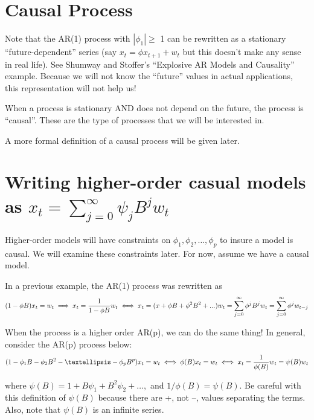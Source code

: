 \documentclass[
]{book}
\theoremstyle{definition}
\theoremstyle{definition}
\theoremstyle{definition}
\theoremstyle{definition}
\theoremstyle{remark}
\begin{document}
\hypertarget{causal-process}{%
\section{Causal Process}\label{causal-process}}

Note that the AR(1) process with \(|\phi_1|\ge\) 1 can be rewritten as a stationary ``future-dependent'' series (say \(x_t=\phi x_{t+1}+w_t\) but this doesn't make any sense in real life). See Shumway and Stoffer's ``Explosive AR Models and Causality'' example. Because we will not know the ``future'' values in actual applications, this representation will not help us!

When a process is stationary AND does not depend on the future, the process is ``causal''. These are the type of processes that we will be interested in.

A more formal definition of a causal process will be given later.

\hypertarget{writing-higher-order-casual-models-as-x_tsum_j0inftypsi_jbjw_t}{%
\section{\texorpdfstring{Writing higher-order casual models as \(x_t=\sum_{j=0}^{\infty}\psi_jB^jw_t\)}{Writing higher-order casual models as x\_t=\textbackslash sum\_\{j=0\}\^{}\{\textbackslash infty\}\textbackslash psi\_jB\^{}jw\_t}}\label{writing-higher-order-casual-models-as-x_tsum_j0inftypsi_jbjw_t}}

Higher-order models will have constraints on \(\phi_1, \phi_2, … , \phi_p\) to insure a model is causal. We will examine these constraints later. For now, assume we have a causal model.

In a previous example, the AR(1) process was rewritten as
\[(1-\phi B)x_t=w_t\\
\implies x_t=\frac{1}{1-\phi B}w_t\\
\iff x_t=(x+\phi B+ \phi^2B^2+...)w_t\\
=\sum_{j=0}^{\infty}\phi^jB^jw_t=\sum_{j=0}^{\infty}\phi^jw_{t-j}\]

When the process is a higher order AR(p), we can do the same thing! In general, consider the AR(p) process below:
\[(1-\phi_1B-\phi_2B^2-…-\phi_pB^p)x_t = w_t\\
\iff \phi(B)x_t=w_t\\
\iff x_t=\frac{1}{\phi(B)}w_t=\psi(B)w_t\]

where \(\psi(B) = 1+B\psi_1+B^2\psi_2+…,\) and \(1/\phi(B) = \psi(B)\). Be careful with this definition of \(\psi(B)\) because there are +, not --, values separating the terms. Also, note that \(\psi(B)\) is an infinite series.
\end{document}
